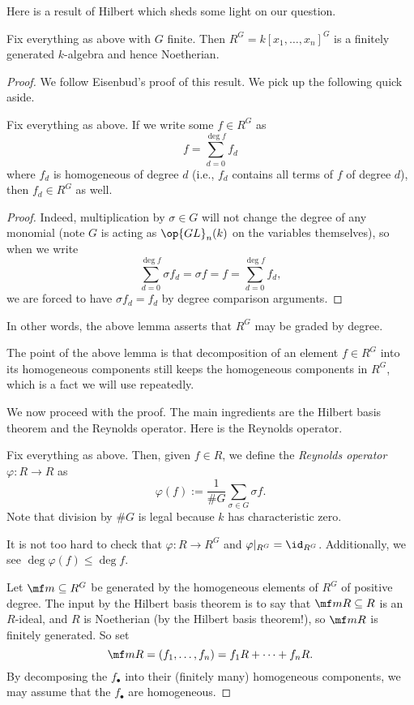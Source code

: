 Here is a result of Hilbert which sheds some light on our question.
\begin{theorem}
	Fix everything as above with $G$ finite. Then $R^G=k[x_1,\ldots,x_n]^G$ is a finitely generated $k$-algebra and hence Noetherian.
\end{theorem}
\begin{proof}
	We follow Eisenbud's proof of this result. We pick up the following quick aside.
	\begin{lemma}
		Fix everything as above. If we write some $f\in R^G$ as
		\[f=\sum_{d=0}^{\deg f}f_d\]
		where $f_d$ is homogeneous of degree $d$ (i.e., $f_d$ contains all terms of $f$ of degree $d$), then $f_d\in R^G$ as well.
	\end{lemma}
	\begin{proof}
		Indeed, multiplication by $\sigma\in G$ will not change the degree of any monomial (note $G$ is acting as $\op{GL}_n(k)$ on the variables themselves), so when we write
		\[\sum_{d=0}^{\deg f}\sigma f_d=\sigma f=f=\sum_{d=0}^{\deg f}f_d,\]
		we are forced to have $\sigma f_d=f_d$ by degree comparison arguments.
	\end{proof}
	\begin{remark}
		In other words, the above lemma asserts that $R^G$ may be graded by degree.
	\end{remark}
	The point of the above lemma is that decomposition of an element $f\in R^G$ into its homogeneous components still keeps the homogeneous components in $R^G$, which is a fact we will use repeatedly.
	
	We now proceed with the proof. The main ingredients are the Hilbert basis theorem and the Reynolds operator. Here is the Reynolds operator.
	\begin{definition}
		Fix everything as above. Then, given $f\in R$, we define the \textit{Reynolds operator} $\varphi:R\to R$ as
		\[\varphi(f):=\frac1{\#G}\sum_{\sigma\in G}\sigma f.\]
		Note that division by $\#G$ is legal because $k$ has characteristic zero.
	\end{definition}
	\noindent It is not too hard to check that $\varphi:R\to R^G$ and $\varphi|_{R^G}=\id_{R^G}$. Additionally, we see $\deg\varphi(f)\le\deg f$.

	Let $\mf m\subseteq R^G$ be generated by the homogeneous elements of $R^G$ of positive degree. The input by the Hilbert basis theorem is to say that $\mf mR\subseteq R$ is an $R$-ideal, and $R$ is Noetherian (by the Hilbert basis theorem!), so $\mf mR$ is finitely generated. So set
	\[\mf mR=(f_1,\ldots,f_n)=f_1R+\cdots+f_nR.\]
	By decomposing the $f_\bullet$ into their (finitely many) homogeneous components, we may assume that the $f_\bullet$ are homogeneous.
	

\end{proof}
